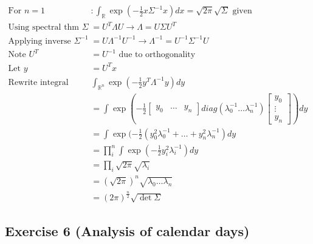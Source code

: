 \documentclass[11pt]{article}
\begin{document}
\begin{solution}
\begin{align*}
    \text{For } n = 1&: \int_{\mathbb{R}} \exp(-\frac{1}{2} x \Sigma^{-1} x) dx = \sqrt{2 \pi} \sqrt{\Sigma} \text{ given} \\
    \text{Using spectral thm } \Sigma &= U^T \Lambda U \rightarrow \Lambda = U \Sigma U^T \\
    \text{Applying inverse } \Sigma^{-1} &= U \Lambda^{-1} U^{-1} \rightarrow \Lambda^{-1} = U^{-1} \Sigma^{-1} U \\
    \text{Note } U^T &= U^{-1} \text{ due to orthogonality} \\
    \text{Let } y &= U^T x \\
    \text{Rewrite integral } &\int_{\mathbb{R}^n} \exp(-\frac{1}{2} y^T \Lambda^{-1} y) dy \\
    &= \int \exp(-\frac{1}{2} \begin{bmatrix} y_0 & \dots & y_n\end{bmatrix} diag(\lambda_0^{-1} \dots \lambda_n^{-1}) \begin{bmatrix} y_0 \\ \vdots \\ y_n \end{bmatrix}) dy \\
    &= \int \exp(-\frac{1}{2} (y_0^2 \lambda_0^{-1} + \dots + y_n^2 \lambda_n^{-1}) dy \\
    &= \prod_i^{n} \int \exp(-\frac{1}{2} y_i^2 \lambda_i^{-1}) dy \\
    &= \prod_i \sqrt{2 \pi} \sqrt{\lambda_i} \\
    &= (\sqrt{2 \pi})^n \sqrt{\lambda_0 \dots \lambda_n} \\
    &= (2 \pi)^{\frac{n}{2}} \sqrt{\det \Sigma}
\end{align*}

\end{solution}

\newpage
\subsection*{Exercise 6 (Analysis of calendar days)}
\end{document}
